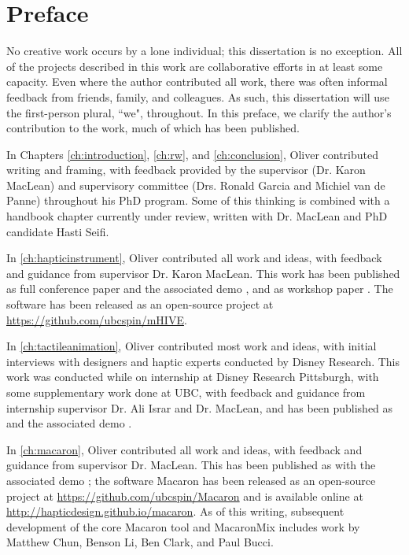 
\chapter{Preface}
No creative work occurs by a lone individual; this dissertation is no exception.
All of the projects described in this work are collaborative efforts in at least some capacity.
Even where the author contributed all work, there was often informal feedback from friends, family, and colleagues.
As such, this dissertation will use the first-person plural, ``we", throughout.
In this preface, we clarify the author's contribution to the work, much of which has been published.

In Chapters \ref{ch:introduction}, \ref{ch:rw}, and \ref{ch:conclusion}, Oliver contributed writing and framing, with feedback provided by the supervisor (Dr. Karon MacLean) and supervisory committee (Drs. Ronald Garcia and Michiel van de Panne) throughout his PhD program. 
Some of this thinking is combined with a handbook chapter currently under review, written with Dr. MacLean and PhD candidate Hasti Seifi.

In \autoref{ch:hapticinstrument}, Oliver contributed all work and ideas, with feedback and guidance from supervisor Dr. Karon MacLean.
This work has been published as full conference paper \citet{Schneider2014} and the associated demo \citet{Schneider2014c}, and as workshop paper \citet{Schneider2014b}.
The software has been released as an open-source project at \url{https://github.com/ubcspin/mHIVE}.

In \autoref{ch:tactileanimation}, Oliver contributed most work and ideas, with initial interviews with designers and haptic experts conducted by Disney Research.
This work was conducted while on internship at Disney Research Pittsburgh, with some supplementary work done at UBC, with feedback and guidance from internship supervisor Dr. Ali Israr and Dr. MacLean, and has been published as \citet{Schneider2015} and the associated demo \citet{Schneider-demo-ta2015}.

In \autoref{ch:macaron}, Oliver contributed all work and ideas, with feedback and guidance from supervisor Dr. MacLean.
This has been published as \citet{Schneider2016macaron} with the associated demo \citet{}; the software 
Macaron has been released as an open-source project at \url{https://github.com/ubcspin/Macaron} and is available online at \url{http://hapticdesign.github.io/macaron}.
As of this writing, subsequent development of the core Macaron tool and MacaronMix includes work by Matthew Chun, Benson Li, Ben Clark, and Paul Bucci.

